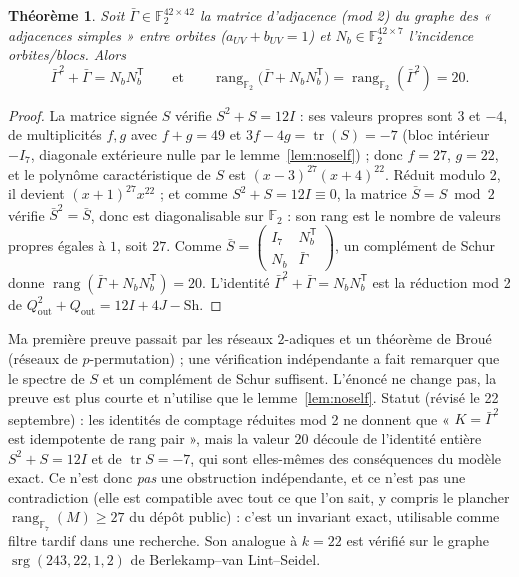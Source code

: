 \documentclass[11pt,a4paper]{article}
\newtheorem{theorem}{Théorème}
\theoremstyle{definition}
\theoremstyle{remark}
\newcommand{\F}{\mathbb{F}}
\newcommand{\rg}{\operatorname{rang}}
\newcommand{\srg}{\operatorname{srg}}
\begin{document}
\begin{theorem}
Soit $\bar\Gamma\in\F_2^{42\times42}$ la matrice d'adjacence (mod 2) du graphe des « adjacences simples » entre orbites ($a_{UV}+b_{UV}=1$) et
$N_b\in\F_2^{42\times7}$ l'incidence orbites/blocs. Alors
\[
\bar\Gamma^2+\bar\Gamma=N_bN_b^{\mathsf T}\qquad\text{et}\qquad \rg_{\F_2}\bigl(\bar\Gamma+N_bN_b^{\mathsf T}\bigr)=\rg_{\F_2}(\bar\Gamma^2)=20 .
\]
\end{theorem}
\begin{proof}
La matrice signée $S$ vérifie $S^2+S=12I$ : ses valeurs propres sont $3$ et $-4$, de multiplicités $f,g$ avec $f+g=49$ et
$3f-4g=\operatorname{tr}(S)=-7$ (bloc intérieur $-I_7$, diagonale extérieure nulle par le lemme~\ref{lem:noself}) ; donc $f=27$, $g=22$, et le polynôme
caractéristique de $S$ est $(x-3)^{27}(x+4)^{22}$.
Réduit modulo 2, il devient $(x+1)^{27}x^{22}$ ; et comme $S^2+S=12I\equiv0$, la matrice $\bar S=S\bmod2$ vérifie $\bar S^2=\bar S$, donc est diagonalisable
sur $\F_2$ : son rang est le nombre de valeurs propres égales à $1$, soit $27$. Comme $\bar S=\begin{pmatrix}I_7&N_b^{\mathsf T}\\N_b&\bar\Gamma\end{pmatrix}$,
un complément de Schur donne $\rg(\bar\Gamma+N_bN_b^{\mathsf T})=20$. L'identité $\bar\Gamma^2+\bar\Gamma=N_bN_b^{\mathsf T}$ est la réduction mod 2 de
$Q_{\mathrm{out}}^2+Q_{\mathrm{out}}=12I+4J-\mathrm{Sh}$.
\end{proof}
Ma première preuve passait par les réseaux $2$-adiques et un théorème de Broué (réseaux de $p$-permutation) ; une vérification indépendante a fait remarquer
que le spectre de $S$ et un complément de Schur suffisent. L'énoncé ne change pas, la preuve est plus courte et n'utilise que le lemme~\ref{lem:noself}.
Statut (révisé le 22 septembre) : les identités de comptage réduites mod 2 ne donnent que « $K=\bar\Gamma^2$ est idempotente de rang pair », mais la valeur $20$
découle de l'identité entière $S^2+S=12I$ et de $\operatorname{tr}S=-7$, qui sont elles-mêmes des conséquences du modèle exact. Ce n'est donc \emph{pas} une obstruction
indépendante, et ce n'est pas une contradiction (elle est compatible avec tout ce que l'on sait, y compris le plancher $\rg_{\F_7}(M)\ge27$ du dépôt public) :
c'est un invariant exact, utilisable comme filtre tardif dans une recherche. Son analogue à $k=22$ est vérifié sur le graphe $\srg(243,22,1,2)$ de Berlekamp--van Lint--Seidel.
\end{document}
